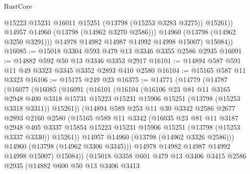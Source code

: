 \begin{lexlean}{RustCore}
\begin{coremodule}
                  @15223
                  @15231
                  @16011
                  @15251
                  (@13798 (@15253 @3283 @3275))
                  @15261))
              @14957
              @14960
              (@13798 (@14962 @3270 @2586)))
            @14960
            (@13798 (@14962 @3250 @3291)))
          @14978
          @14982
          @14987
          @14992
          @14998
          @15007)
        @15084))
@16085 := @15018 @3304 @593 @479 @13 @3346 @3355 @2586 @2935
@16091 := @14882 @592 @50 @13 @3346 @3353 @2917
@16101 := @14894 @587 @591 @11 @49 @3323 @3345 @3352 @2893 @410 @2580
@16104 := @15165 @587 @11 @3323
@16106 := @15175 @249 @23
@16375 := @14771
    (@14779
      (@14787
        (@16077
          (@16085
            (@16091
              (@16101
                (@16104
                  (@16106
                    @23
                    @81
                    @11
                    @3165
                    @2948
                    @400
                    @3318
                    @15731
                    @15223
                    @15231
                    @15906
                    @15251
                    (@13798 (@15253 @3318 @3311))
                    @15261))
                (@14894
                  @589
                  @253
                  @11
                  @30
                  @3342
                  @2586
                  @2677
                  @2893
                  @2160
                  @2580
                  (@15165
                    @589
                    @11
                    @3342
                    (@16035
                      @23
                      @81
                      @11
                      @3187
                      @2948
                      @405
                      @3337
                      @15854
                      @15223
                      @15231
                      @15906
                      @15251
                      (@13798 (@15253 @3337 @3330))
                      @15261))
                  @14957
                  @14960
                  (@13798 (@14962 @3326 @2586)))
                @14960
                (@13798 (@14962 @3306 @3345)))
              @14978
              @14982
              @14987
              @14992
              @14998
              @15007)
            @15084))
        (@15018
          @3358
          @601
          @479
          @13
          @3406
          @3415
          @2586
          @2935
          (@14882
            @600
            @50
            @13
            @3406
            @3413

\end{coremodule}
\end{lexlean}
